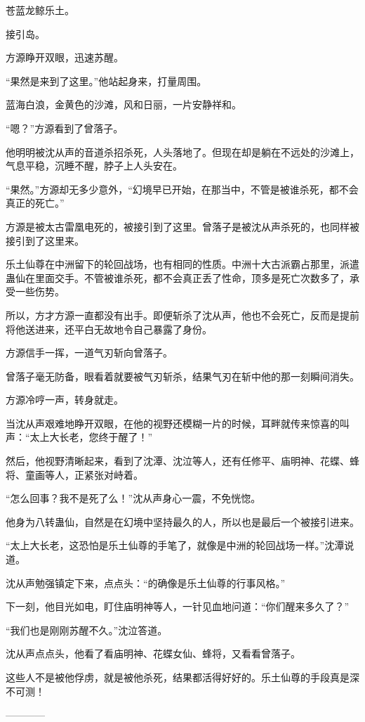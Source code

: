 \begin{this_body}
苍蓝龙鲸乐土。

接引岛。

方源睁开双眼，迅速苏醒。

“果然是来到了这里。”他站起身来，打量周围。

蓝海白浪，金黄色的沙滩，风和日丽，一片安静祥和。

“嗯？”方源看到了曾落子。

他明明被沈从声的音道杀招杀死，人头落地了。但现在却是躺在不远处的沙滩上，气息平稳，沉睡不醒，脖子上人头安在。

“果然。”方源却无多少意外，“幻境早已开始，在那当中，不管是被谁杀死，都不会真正的死亡。”

方源是被太古雷凰电死的，被接引到了这里。曾落子是被沈从声杀死的，也同样被接引到了这里来。

乐土仙尊在中洲留下的轮回战场，也有相同的性质。中洲十大古派霸占那里，派遣蛊仙在里面交手。不管被谁杀死，都不会真正丢了性命，顶多是死亡次数多了，承受一些伤势。

所以，方才方源一直都没有出手。即便斩杀了沈从声，他也不会死亡，反而是提前将他送进来，还平白无故地令自己暴露了身份。

方源信手一挥，一道气刃斩向曾落子。

曾落子毫无防备，眼看着就要被气刃斩杀，结果气刃在斩中他的那一刻瞬间消失。

方源冷哼一声，转身就走。

当沈从声艰难地睁开双眼，在他的视野还模糊一片的时候，耳畔就传来惊喜的叫声：“太上大长老，您终于醒了！”

然后，他视野清晰起来，看到了沈潭、沈泣等人，还有任修平、庙明神、花蝶、蜂将、童画等人，正紧张对峙着。

“怎么回事？我不是死了么！”沈从声身心一震，不免恍惚。

他身为八转蛊仙，自然是在幻境中坚持最久的人，所以也是最后一个被接引进来。

“太上大长老，这恐怕是乐土仙尊的手笔了，就像是中洲的轮回战场一样。”沈潭说道。

沈从声勉强镇定下来，点点头：“的确像是乐土仙尊的行事风格。”

下一刻，他目光如电，盯住庙明神等人，一针见血地问道：“你们醒来多久了？”

“我们也是刚刚苏醒不久。”沈泣答道。

沈从声点点头，他看了看庙明神、花蝶女仙、蜂将，又看看曾落子。

这些人不是被他俘虏，就是被他杀死，结果都活得好好的。乐土仙尊的手段真是深不可测！

------------

\end{this_body}

